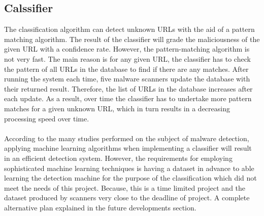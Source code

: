 
\subsection{Calssifier}

The classification algorithm can detect unknown URLs with the aid of a pattern matching algorithm. The result of the classifier will grade the maliciousness of the given URL with a confidence rate. However, the pattern-matching algorithm is not very fast. The main reason is for any given URL, the classifier has to check the pattern of all URLs in the database to find if there are any matches. After running the system each time, five malware scanners update the database with their returned result. Therefore, the list of URLs in the database increases after each update. As a result, over time the classifier has to undertake more pattern matches for a given unknown URL, which in turn results in a decreasing processing speed over time.

\paragraph{} 
According to the many studies performed on the subject of malware detection, applying machine learning algorithms when implementing a classifier will result in an efficient detection system. However, the requirements for employing sophisticated machine learning techniques is having a dataset in advance to able learning the detection machine for the purpose of the classification which did not meet the needs of this project. Because, this is a time limited project and the dataset produced by scanners very close to the deadline of project. A complete alternative plan explained in the future developments section. 
